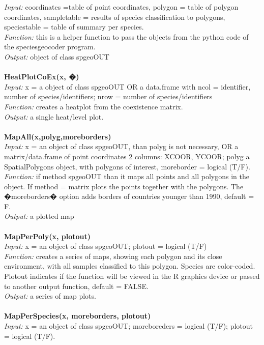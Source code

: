 \documentclass[a4paper,titlepage,11pt]{scrreprt}
\begin{document}
\textit{Input:} coordinates =table of point coordinates, polygon = table of polygon coordinates, sampletable = results of species classification to polygons, speciestable = table of summary per species.\\
\textit{Function:} this is a helper function to pass the objects from the python code of the speciesgeocoder program.\\
\textit{Output:} object of class spgeoOUT\\
\\
\textbf{HeatPlotCoEx(x, �)}\\
\textit{Input:} x = a object of class spgeoOUT OR a data.frame with ncol = identifier, number of species/identifiers; nrow = number of species/identifiers\\
\textit{Function:} creates a heatplot from the coexistence matrix.\\
\textit{Output:} a single heat/level plot.\\
\\
\textbf{MapAll(x,polyg,moreborders)}\\
\textit{Input:} x = an object of class spgeoOUT, than polyg is not necessary, OR a matrix/data.frame of point coordinates 2 columns: XCOOR, YCOOR; polyg a SpatialPolygons object, with polygons of interest, moreborder = logical (T/F).\\
\textit{Function:} if method spgeoOUT than it maps all points and all polygons in the object. If method = matrix plots the points together with the polygons. The �moreborders� option adds borders of countries younger than 1990, default = F.\\
\textit{Output:} a plotted map\\
\\
\textbf{MapPerPoly(x, plotout)}\\
\textit{Input:} x = an object of class spgeoOUT; plotout = logical (T/F)\\
\textit{Function:} creates a series of maps, showing each polygon and its close environment, with all samples classified to this polygon. Species are color-coded. Plotout indicates if the function will be viewed in the R graphics device or passed to another output function, default = FALSE. \\
\textit{Output:} a series of map plots.\\
\\
\textbf{MapPerSpecies(x, moreborders, plotout)}\\
\textit{Input:} x = an object of class spgeoOUT; moreboreders = logical (T/F); plotout = logical (T/F).\\
\end{document}
